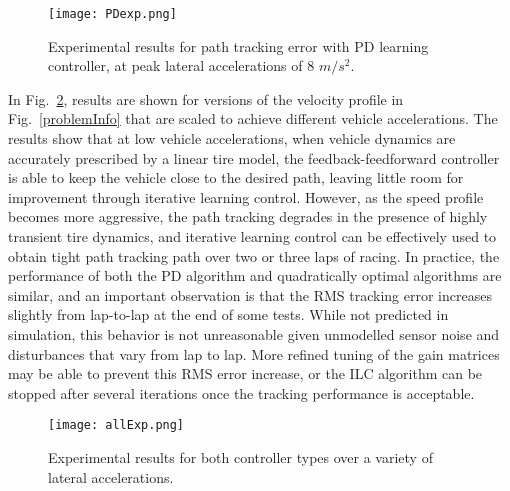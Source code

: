 \documentclass[letterpaper, 10 pt, conference]{ieeeconf}  %
\begin{document}
\begin{figure}[h]
\centering
\texttt{[image: PDexp.png]}
\caption{Experimental results for path tracking error with PD learning controller, at peak lateral accelerations of 8 $m/s^2$.}
\label{fig:PDexp}
\end{figure}

In Fig.~\ref{fig:allExp}, results are shown for versions of the velocity profile in Fig.~\ref{problemInfo} that are scaled to achieve different vehicle accelerations. The results
show that at low vehicle accelerations, when vehicle dynamics are accurately prescribed by a linear tire model, the feedback-feedforward controller is able to keep the vehicle close to the
desired path, leaving little room for improvement through iterative learning control. However, as the speed profile becomes more aggressive, the path tracking degrades in the presence
of highly transient tire dynamics, and iterative learning control can be effectively used to obtain tight path tracking path over two or three laps of racing. 
In practice, the performance of both the PD algorithm and quadratically optimal algorithms are similar, and an important observation is that the RMS tracking error increases slightly from
lap-to-lap at the end of some tests. While not predicted in simulation, this behavior is not unreasonable given unmodelled sensor noise and disturbances that vary from lap to lap. 
More refined tuning of the gain matrices may be able to prevent this RMS error increase, or the ILC algorithm can be stopped after several iterations once the tracking performance is acceptable.



\begin{figure}
\centering
\texttt{[image: allExp.png]}
\caption{Experimental results for both controller types over a variety of lateral accelerations.}
\label{fig:allExp}
\end{figure}

\end{document}
